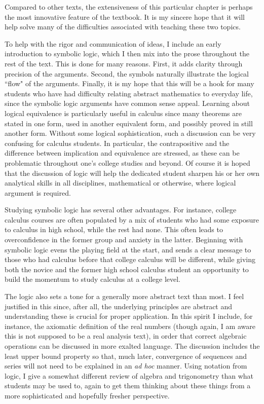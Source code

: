 Compared to other texts, the extensiveness of this particular
chapter is perhaps the most innovative feature of the textbook.
It is my sincere hope that it will help solve many of the difficulties
associated with teaching these two topics.

\bigskip
{}
\bigskip

To help with the rigor and communication of ideas, I
include an early introduction to symbolic logic, which I then
mix into the prose throughout the rest of the text.
This is done for many reasons.  First, it adds clarity through
precision of the arguments.  Second, the symbols naturally illustrate
the logical ``flow" of the arguments.  Finally,
it is my hope
that this will be a hook for many students who
have had difficulty relating abstract mathematics to 
everyday life, since the symbolic logic arguments have
common sense appeal.  Learning about logical 
equivalence is particularly useful in 
calculus since many theorems are stated in one form,
used in another equivalent form, and possibly proved in
still another form.  Without some logical sophistication, 
such a discussion can be very confusing for calculus students.
In particular, the contrapositive and the difference
between implication and equivalence are stressed, 
as these can be problematic throughout one's college
studies and beyond.
Of course it is hoped that the discussion of logic will help
the dedicated student sharpen his or her own analytical
skills in all disciplines, mathematical or
otherwise, where logical argument is required.


Studying symbolic logic has several other advantages.
For instance, college calculus courses are often populated
by a mix of students who had some exposure to calculus in
high school, while the rest had none.  This often leads
to overconfidence in the former group and anxiety in the latter.
Beginning with symbolic logic evens the playing field at the 
start, and sends a clear message to those who had calculus before
that college calculus will be different, while giving both
the novice and the former high school calculus student
an opportunity to build the momentum to study calculus at
a college level.

The logic also sets a tone for a generally more abstract text
than most.  I feel justified in this since, after all, 
the underlying principles
are abstract and understanding these is crucial for
proper application.  In this spirit I include, for instance, the
axiomatic definition of the real numbers (though  again,
I am aware this is not 
supposed to be a real analysis text), in order that correct algebraic
operations can be discussed in more exalted language.
The discussion includes the least upper bound property
so that, much later, convergence of sequences and series will not
need to be explained in an {\it ad hoc} manner.
Using notation from logic, I  give a
somewhat different review of algebra and trigonometry
than what students may be used to, again to get them
thinking about these things from a more sophisticated and
hopefully fresher perspective.  

